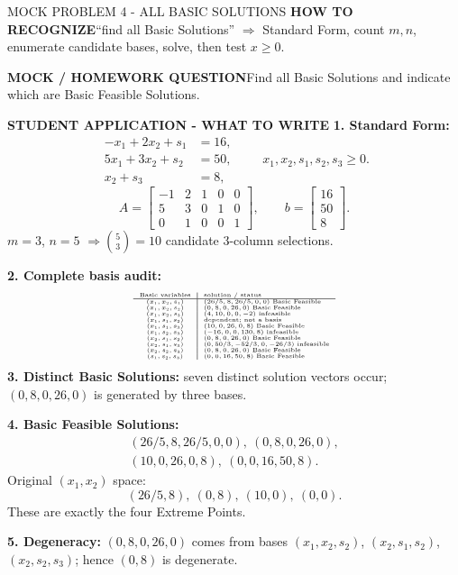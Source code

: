 \documentclass[10pt,landscape]{article}
\newcommand{\recognize}{\textbf{HOW TO RECOGNIZE}\quad}
\newcommand{\question}{\textbf{MOCK / HOMEWORK QUESTION}\quad}
\newcommand{\example}{\textbf{STUDENT APPLICATION - WHAT TO WRITE}\quad}
\begin{document}
\begin{minipage}[t]{0.330\textwidth}\vspace{0pt}
\begin{blk}{MOCK PROBLEM 4 - ALL BASIC SOLUTIONS}
\recognize ``find all Basic Solutions'' $\Rightarrow$ Standard Form, count $m,n$, enumerate candidate bases, solve, then test $x\ge0$.

\question Find all Basic Solutions and indicate which are Basic Feasible Solutions.

\example
\textbf{1. Standard Form:}
\[
\begin{aligned}
-x_1+2x_2+s_1&=16,\\
5x_1+3x_2+s_2&=50,\\
x_2+s_3&=8,
\end{aligned}
\qquad x_1,x_2,s_1,s_2,s_3\ge0.
\]
\[
A=\begin{bmatrix}-1&2&1&0&0\\5&3&0&1&0\\0&1&0&0&1\end{bmatrix},\qquad b=\begin{bmatrix}16\\50\\8\end{bmatrix}.
\]
$m=3$, $n=5$ $\Rightarrow\binom53=10$ candidate 3-column selections.

\textbf{2. Complete basis audit:}
\[
{\fontsize{4.55}{4.78}\selectfont
\begin{array}{c|l}
\text{Basic variables}&\text{solution / status}\\\hline
(x_1,x_2,s_1)&(26/5,8,26/5,0,0)\ \text{Basic Feasible}\\
(x_1,x_2,s_2)&(0,8,0,26,0)\ \text{Basic Feasible}\\
(x_1,x_2,s_3)&(4,10,0,0,-2)\ \text{infeasible}\\
(x_1,s_1,s_2)&\text{dependent; not a basis}\\
(x_1,s_1,s_3)&(10,0,26,0,8)\ \text{Basic Feasible}\\
(x_1,s_2,s_3)&(-16,0,0,130,8)\ \text{infeasible}\\
(x_2,s_1,s_2)&(0,8,0,26,0)\ \text{Basic Feasible}\\
(x_2,s_1,s_3)&(0,50/3,-52/3,0,-26/3)\ \text{infeasible}\\
(x_2,s_2,s_3)&(0,8,0,26,0)\ \text{Basic Feasible}\\
(s_1,s_2,s_3)&(0,0,16,50,8)\ \text{Basic Feasible}
\end{array}}
\]
\textbf{3. Distinct Basic Solutions:} seven distinct solution vectors occur; $(0,8,0,26,0)$ is generated by three bases.

\textbf{4. Basic Feasible Solutions:}
\[
\boxed{\begin{gathered}
(26/5,8,26/5,0,0),\ (0,8,0,26,0),\\
(10,0,26,0,8),\ (0,0,16,50,8).
\end{gathered}}
\]
Original $(x_1,x_2)$ space:
\[
\boxed{(26/5,8),\ (0,8),\ (10,0),\ (0,0)}.
\]
These are exactly the four Extreme Points.

\textbf{5. Degeneracy:} $(0,8,0,26,0)$ comes from bases $(x_1,x_2,s_2)$, $(x_2,s_1,s_2)$, $(x_2,s_2,s_3)$; hence $(0,8)$ is degenerate.
\end{blk}
\end{minipage}
\end{document}
